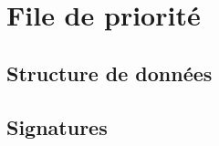 \section{File de priorité}

\subsection*{Structure de données}

\begin{algorithme}
    \begin{enregistrement}{\priorityQueue}
    \end{enregistrement}
\end{algorithme}

\subsection*{Signatures}

\begin{algorithme}
\end{algorithme}